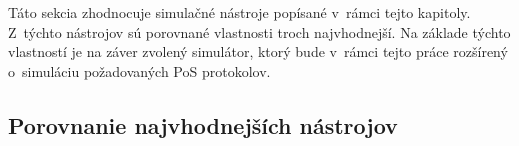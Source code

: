 Táto sekcia zhodnocuje simulačné nástroje popísané v~rámci tejto kapitoly. Z~týchto nástrojov sú porovnané vlastnosti troch najvhodnejší. Na základe týchto vlastností je na záver zvolený simulátor, ktorý bude v~rámci tejto práce rozšírený o~simuláciu požadovaných PoS protokolov.

\subsection{Porovnanie najvhodnejších nástrojov}

\begin{table}[tb]
	\caption{Matica podporovaných vlastností zvolených simulátorov na sieťovej, konsenzus a dátovej vrstve.}
	\label{tab:sim-layers}
\end{table}

